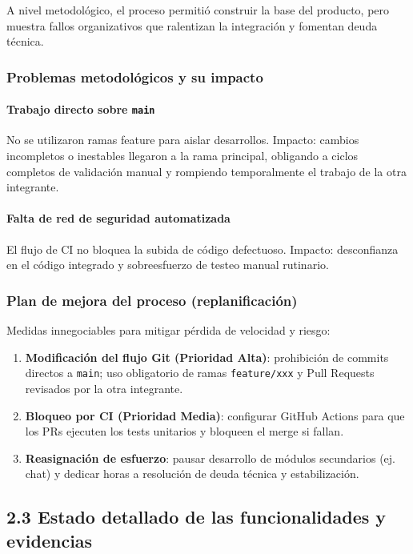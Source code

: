 \documentclass[a4paper,11pt]{article}
\begin{document}
A nivel metodológico, el proceso permitió construir la base del producto, pero muestra fallos organizativos que ralentizan la integración y fomentan deuda técnica.

\subsubsection*{Problemas metodológicos y su impacto}

\paragraph{Trabajo directo sobre \texttt{main}} No se utilizaron ramas feature para aislar desarrollos. Impacto: cambios incompletos o inestables llegaron a la rama principal, obligando a ciclos completos de validación manual y rompiendo temporalmente el trabajo de la otra integrante.

\paragraph{Falta de red de seguridad automatizada} El flujo de CI no bloquea la subida de código defectuoso. Impacto: desconfianza en el código integrado y sobreesfuerzo de testeo manual rutinario.

\subsubsection*{Plan de mejora del proceso (replanificación)}

Medidas innegociables para mitigar pérdida de velocidad y riesgo:
\begin{enumerate}
	\item \textbf{Modificación del flujo Git (Prioridad Alta)}: prohibición de commits directos a \texttt{main}; uso obligatorio de ramas \texttt{feature/xxx} y Pull Requests revisados por la otra integrante.
	\item \textbf{Bloqueo por CI (Prioridad Media)}: configurar GitHub Actions para que los PRs ejecuten los tests unitarios y bloqueen el merge si fallan.
	\item \textbf{Reasignación de esfuerzo}: pausar desarrollo de módulos secundarios (ej. chat) y dedicar horas a resolución de deuda técnica y estabilización.
\end{enumerate}

\subsection*{2.3 Estado detallado de las funcionalidades y evidencias}
\end{document}

